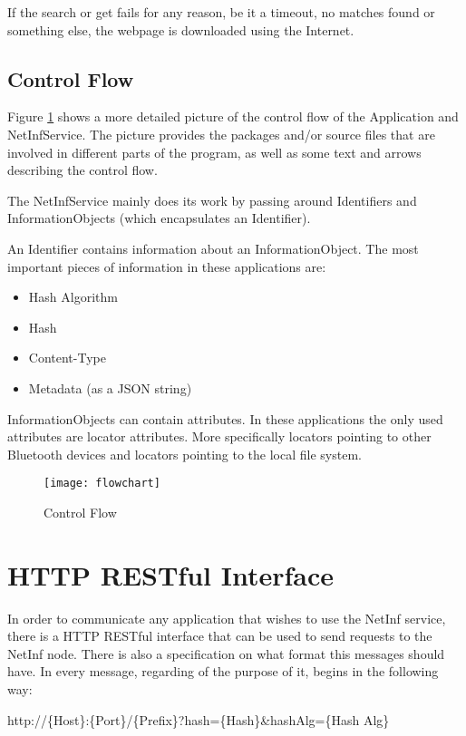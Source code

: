 \documentclass[10pt,a4paper]{article}
\begin{document}
If the search or get fails for any reason, be it a timeout, no matches found or something else, the webpage is downloaded using the Internet.

\subsection{Control Flow}

Figure \ref{fig:controlflow} shows a more detailed picture of the control flow of the Application and NetInfService. The picture provides the packages and/or source files that are involved in different parts of the program, as well as some text and arrows describing the control flow.

The NetInfService mainly does its work by passing around Identifiers and InformationObjects (which encapsulates an Identifier).

An Identifier contains information about an InformationObject. The most important pieces of information in these applications are:
\begin{itemize}
\item Hash Algorithm
\item Hash
\item Content-Type
\item Metadata (as a JSON string)
\end{itemize}

InformationObjects can contain attributes. In these applications the only used attributes are locator attributes. More specifically locators pointing to other Bluetooth devices and locators pointing to the local file system.

\begin{figure}[h!]
	\centering
		\texttt{[image: flowchart]}
    	\caption{Control Flow}
	\label{fig:controlflow}
\end{figure}

\section{HTTP RESTful Interface}
In order to communicate any application that wishes to use the NetInf service, there is a HTTP RESTful interface that can be used to 
send requests to the NetInf node. There is also a specification on what format this messages should have. In every message, regarding 
of the purpose of it, begins in the following way:\\


\begin{center}
http://\{Host\}:\{Port\}/\{Prefix\}?hash=\{Hash\}\&hashAlg=\{Hash Alg\}\\
\end{center}
\end{document}
